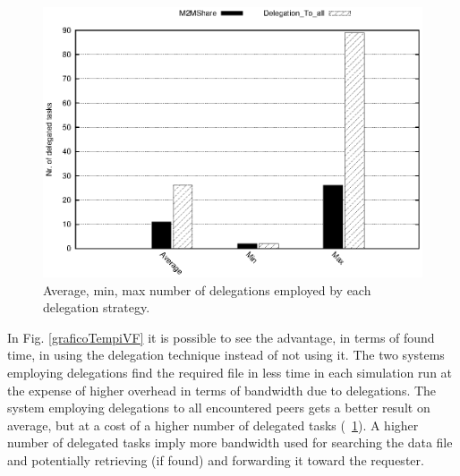 \begin{figure}[!htbp]
\centering
\includegraphics{grafici/delegheFatte.eps}
\caption{Average, min, max number of delegations employed by each delegation strategy.}
\label{graficoNumeroDeleghe}
\end{figure}



In Fig. \ref{graficoTempiVF} it is possible to see the advantage, in terms of found time, in using the delegation technique instead of not using it. The two systems employing delegations find the required file in less time in each simulation run at the expense of higher overhead in terms of bandwidth due to delegations. The system employing delegations to all encountered peers gets a better result on average, but at a cost of a higher number of delegated tasks (\figurename~\ref{graficoNumeroDeleghe}). A higher number of delegated tasks imply more bandwidth used for searching the data file and potentially retrieving (if found) and forwarding it toward the requester.
\\

